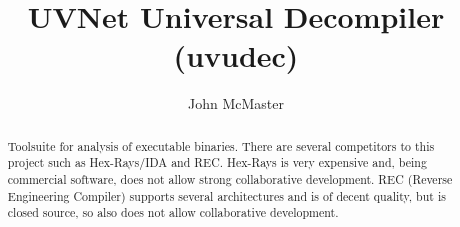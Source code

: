 \documentclass[letterpaper,onecolumn]{article}
\title{UVNet Universal Decompiler (uvudec)}
\author{John McMaster}
\begin{document}
\maketitle
\begin{abstract}
Toolsuite for analysis of executable binaries.  There are several competitors to this project such as Hex-Rays/IDA and REC.
Hex-Rays is very expensive and, being commercial software, does not allow strong collaborative development.
REC (Reverse Engineering Compiler) supports several architectures and is of decent quality, but is closed source, so also does
not allow collaborative development.
\end{abstract}




% 
% 
\end{document}
